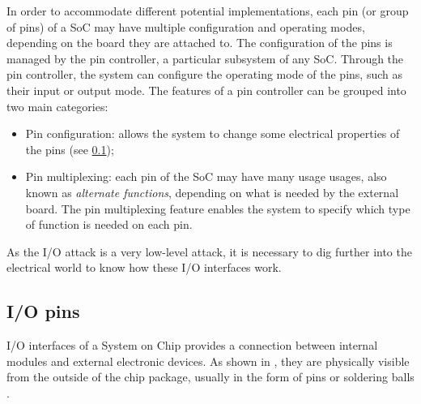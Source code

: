 In order to accommodate different potential implementations, each pin (or group of pins) of a SoC may have multiple configuration and operating modes,
depending on the board they are attached to. The configuration of the pins is managed by the pin controller, a particular subsystem of any SoC.
Through the pin controller, the system can configure the operating mode of the pins, such as their input or output mode.
The features of a pin controller can be grouped into two main categories:
\begin{itemize}
	\item Pin configuration: allows the system to change some electrical properties of the pins (see \sec \ref{sec:iopins});
	\item Pin multiplexing: each pin of the SoC may have many usage usages, also known as \emph{alternate functions}, depending on what is needed by the external board.
		The pin multiplexing feature enables the system to specify which type of function is needed on each pin.
\end{itemize}
As the I/O attack is a very low-level attack, it is necessary to dig further into the electrical world to know how these I/O interfaces work.


\subsection{I/O pins}
\label{sec:iopins}

I/O interfaces of a System on Chip provides a connection between internal modules and external electronic devices.
As shown in \myfig{\ref{fig:chips}}, they are physically visible from the outside of the chip package,
usually in the form of pins  or soldering balls .

